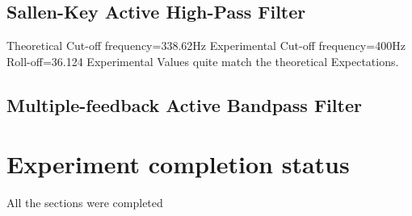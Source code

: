 \documentclass[12pt]{article}
\begin{document}
\subsection{Sallen-Key Active High-Pass Filter}
Theoretical Cut-off frequency=338.62Hz
Experimental Cut-off frequency=400Hz
Roll-off=36.124
Experimental Values quite match the theoretical Expectations.
\subsection{Multiple-feedback Active Bandpass Filter}

\section{Experiment completion status}
All the sections were completed
\end{document}
